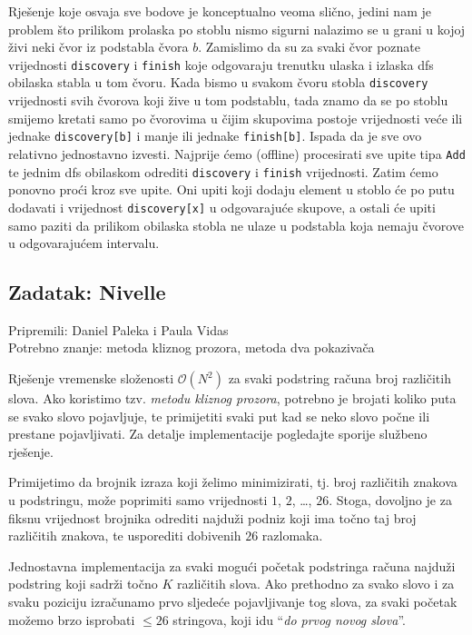 \documentclass[a4paper]{article}
\begin{document}
Rješenje koje osvaja sve bodove je konceptualno veoma slično, jedini nam je
problem što prilikom prolaska po stoblu nismo sigurni nalazimo se u grani
u kojoj živi neki čvor iz podstabla čvora $b$. Zamislimo da su za svaki čvor
poznate vrijednosti \texttt{discovery} i \texttt{finish} koje odgovaraju
trenutku ulaska i izlaska dfs obilaska stabla u tom čvoru. Kada bismo u svakom
čvoru stobla \texttt{discovery} vrijednosti svih čvorova koji žive u tom
podstablu, tada znamo da se po stoblu smijemo kretati samo po čvorovima
u čijim skupovima postoje vrijednosti veće ili jednake \texttt{discovery[b]} i
manje ili jednake \texttt{finish[b]}. Ispada da je sve ovo relativno jednostavno
izvesti. Najprije ćemo (offline) procesirati sve upite tipa \texttt{Add} te
jednim dfs obilaskom odrediti \texttt{discovery} i \texttt{finish} vrijednosti.
Zatim ćemo ponovno proći kroz sve upite. Oni upiti koji dodaju element u stoblo
će po putu dodavati i vrijednost \texttt{discovery[x]} u odgovarajuće skupove, a
ostali će upiti samo paziti da prilikom obilaska stobla ne ulaze u podstabla
koja nemaju čvorove u odgovarajućem intervalu.

\subsection*{Zadatak: Nivelle}
\textsf{Pripremili: Daniel Paleka i Paula Vidas}\\
\textsf{Potrebno znanje: metoda kliznog prozora, metoda dva pokazivača}

Rješenje vremenske složenosti $\mathcal{O}(N^2)$ za svaki podstring računa broj
različitih slova. Ako koristimo tzv. \textit{metodu kliznog prozora}, potrebno
je brojati koliko puta se svako slovo pojavljuje, te primijetiti svaki put kad
se neko slovo počne ili prestane pojavljivati. Za detalje implementacije
pogledajte sporije službeno rješenje.

Primijetimo da brojnik izraza koji želimo minimizirati, tj. broj različitih
znakova u podstringu, može poprimiti samo vrijednosti $1$, $2$, \dots, $26$.
Stoga, dovoljno je za fiksnu vrijednost brojnika odrediti najduži podniz koji
ima točno taj broj različitih znakova, te usporediti dobivenih $26$ razlomaka.

Jednostavna implementacija za svaki mogući početak podstringa računa najduži
podstring koji sadrži točno $K$ različitih slova. Ako prethodno za svako slovo
i za svaku poziciju izračunamo prvo sljedeće pojavljivanje tog slova, za svaki
početak možemo brzo isprobati $\le 26$ stringova, koji idu “\textit{do prvog
novog slova}”.
\end{document}
